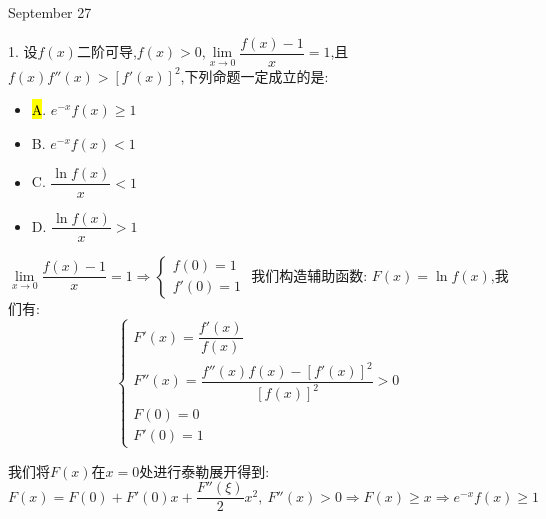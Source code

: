 \textcolor{purplea}{September 27}

1. 设$f(x)$二阶可导,$f(x)>0$,$\lim\limits_{x\to 0}\dfrac{f(x)-1}{x}=1$,且$f(x)f''(x)>[f'(x)]^2$,下列命题一定成立的是:  
\begin{itemize}
	\item \hl{A}. $e^{-x}f(x)\geq 1$
	\item B. $e^{-x}f(x)<1$
	\item C. $\dfrac{\ln f(x)}{x}<1$
	\item D. $\dfrac{\ln f(x)}{x}>1$
\end{itemize}
\begin{solution}

	$\lim\limits_{x\to 0}\dfrac{f(x)-1}{x}=1\Rightarrow \left\lbrace
	\begin{array}{l}
		f(0)=1\\
		f'(0)=1
	\end{array}
	\right. $
	我们构造辅助函数:  $F(x)=\ln f(x)$,我们有:  
	$$\left\lbrace
	\begin{array}{l}
		F'(x)=\dfrac{f'(x)}{f(x)}\\
		F''(x)=\dfrac{f''(x)f(x)-[f'(x)]^2}{[f(x)]^2}>0\\
		F(0)=0\\
		F'(0)=1
	\end{array}
	\right. $$
	
	我们将$F(x)$在$x=0$处进行泰勒展开得到:  
	$$F(x)=F(0)+F'(0)x+\dfrac{F''(\xi)}{2}x^2,\ F''(x)>0\Rightarrow F(x)\geq x\Rightarrow e^{-x}f(x)\geq 1$$
\end{solution}

